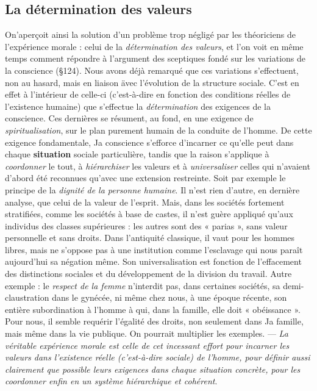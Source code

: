 \subsection{La détermination des valeurs}%
On'aperçoit ainsi la solution
d’un problème trop négligé par les théoriciens de l’expérience
morale : celui de la {\it détermination des valeurs}, et l’on voit en même
temps comment répondre à l’argument des sceptiques fondé sur les
variations de la conscience (\S 124). Nous avons déjà remarqué que
ces variations s’effectuent, non au hasard, mais en liaison ävec l’évolution
de la structure sociale. C’est en effet à l’intérieur de celle-ci
(c’est-à-dire en fonction des conditions réelles de l’existence humaine)
que s’effectue la {\it détermination} des exigences de la conscience. Ces
dernières se résument, au fond, en une exigence de {\it spiritualisation},
sur le plan purement humain de la conduite de l’homme. De cette
exigence fondamentale, Ja conscience s’efforce d’incarner ce qu’elle
peut dans chaque {\bf situation} sociale particulière, tandis que la raison
s'applique à {\it coordonner} le tout, à {\it hiérarchiser} les valeurs et à
{\it universaliser}
celles qui n’avaient d’abord été reconnues qu'avec une extension
restreinte. Soit par exemple le principe de la {\it dignité de la personne
humaine}. Il n’est rien d’autre, en dernière analyse, que celui
de la valeur de l’esprit. Mais, dans les sociétés fortement stratifiées,
comme les sociétés à base de castes, il n’est guère appliqué qu’aux
individus des classes supérieures : les autres sont des « parias », sans
valeur personnelle et sans droits. Dans l’antiquité classique, il vaut
pour les hommes libres, mais ne s’oppose pas à une institution comme
l’esclavage qui nous paraît aujourd’hui sa négation même. Son universalisation
est fonction de l'effacement des distinctions sociales et
du développement de la division du travail. Autre exemple : le {\it respect
de la femme} n’interdit pas, dans certaines sociétés, sa demi-claustration
dans le gynécée, ni même chez nous, à une époque récente, son
entière subordination à l’homme à qui, dans la famille, elle doit
« obéissance ». Pour nous, il semble requérir l’égalité des droits, non
seulement dans Ja famille, mais même dans la vie publique. On pourrait
multiplier les exemples. — {\it La véritable expérience morale est celle
de cet incessant effort pour incarner les valeurs dans l'existence réelle
(c'est-à-dire sociale) de l’homme, pour définir aussi clairement que
possible leurs exigences dans chaque situation concrète, pour les coordonner
enfin en un système hiérarchique et cohérent}.

